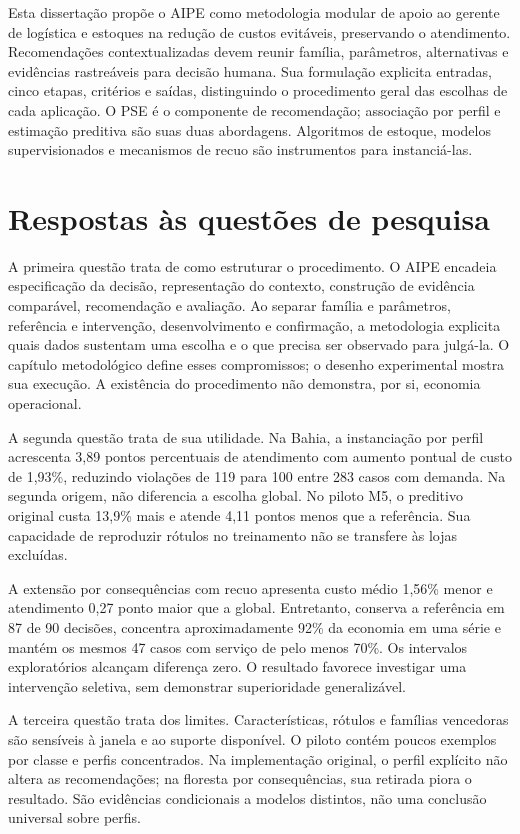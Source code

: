 
Esta dissertação propõe o AIPE como metodologia modular de apoio ao gerente de logística e estoques na redução de custos evitáveis, preservando o atendimento. Recomendações contextualizadas devem reunir família, parâmetros, alternativas e evidências rastreáveis para decisão humana. Sua formulação explicita entradas, cinco etapas, critérios e saídas, distinguindo o procedimento geral das escolhas de cada aplicação. O PSE é o componente de recomendação; associação por perfil e estimação preditiva são suas duas abordagens. Algoritmos de estoque, modelos supervisionados e mecanismos de recuo são instrumentos para instanciá-las.

\section{Respostas às questões de pesquisa}
A primeira questão trata de como estruturar o procedimento. O AIPE encadeia especificação da decisão, representação do contexto, construção de evidência comparável, recomendação e avaliação. Ao separar família e parâmetros, referência e intervenção, desenvolvimento e confirmação, a metodologia explicita quais dados sustentam uma escolha e o que precisa ser observado para julgá-la. O capítulo metodológico define esses compromissos; o desenho experimental mostra sua execução. A existência do procedimento não demonstra, por si, economia operacional.

A segunda questão trata de sua utilidade. Na Bahia, a instanciação por perfil acrescenta 3,89 pontos percentuais de atendimento com aumento pontual de custo de 1,93\%, reduzindo violações de 119 para 100 entre 283 casos com demanda. Na segunda origem, não diferencia a escolha global. No piloto M5, o preditivo original custa 13,9\% mais e atende 4,11 pontos menos que a referência. Sua capacidade de reproduzir rótulos no treinamento não se transfere às lojas excluídas.

A extensão por consequências com recuo apresenta custo médio 1,56\% menor e atendimento 0,27 ponto maior que a global. Entretanto, conserva a referência em 87 de 90 decisões, concentra aproximadamente 92\% da economia em uma série e mantém os mesmos 47 casos com serviço de pelo menos 70\%. Os intervalos exploratórios alcançam diferença zero. O resultado favorece investigar uma intervenção seletiva, sem demonstrar superioridade generalizável.

A terceira questão trata dos limites. Características, rótulos e famílias vencedoras são sensíveis à janela e ao suporte disponível. O piloto contém poucos exemplos por classe e perfis concentrados. Na implementação original, o perfil explícito não altera as recomendações; na floresta por consequências, sua retirada piora o resultado. São evidências condicionais a modelos distintos, não uma conclusão universal sobre perfis.

